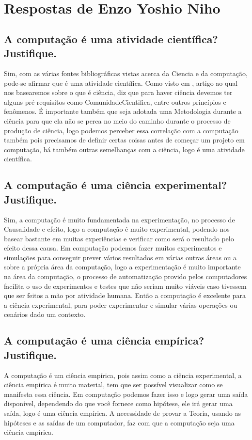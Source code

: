 \section{Respostas de Enzo Yoshio Niho}

\subsection{A computação é uma atividade científica? Justifique. }

Sim, com as várias fontes bibliográficas vistas acerca da \gls{Ciencia} e da computação, pode-se afirmar que é uma atividade científica. Como visto em \citep{fernandes_consideracoes_2021}, artigo ao qual nos basearemos sobre o que é ciência, diz que para haver ciência devemos ter alguns pré-requisitos como \gls{ComunidadeCientifica}, entre outros princípios e fenômenos. É importante também que seja adotada uma \gls{Metodologia} durante a ciência para que ela não se perca no meio do caminho durante o processo de produção de ciência, logo podemos perceber essa correlação com a computação também pois precisamos de definir certas coisas antes de começar um projeto em computação, há também outras semelhanças com a ciência, logo é uma atividade científica.

\subsection{A computação é uma ciência experimental? Justifique. }

Sim, a computação é muito fundamentada na experimentação, no processo de \gls{Causalidade} e efeito, logo a computação é muito experimental, podendo nos basear bastante em muitas experiências e verificar como será o resultado pelo efeito dessa causa. Em computação podemos fazer muitos experimentos e simulações para conseguir prever vários resultados em várias outras áreas ou a sobre a própria área da computação, logo a experimentação é muito importante na área da computação, o processo de automatização provido pelos computadores facilita o uso de experimentos e testes que não seriam muito viáveis caso tivessem que ser feitos a mão por atividade humana. Então a computação é excelente para a ciência experimental, para poder experimentar e simular várias operações ou cenários dado um contexto.

\subsection{A computação é uma ciência empírica? Justifique. }

A computação é um ciência empírica, pois assim como a ciência experimental, a ciência empírica é muito material, tem que ser possível visualizar como se manifesta essa ciência. Em computação podemos fazer isso e logo gerar uma saída disponível, dependendo do que você fornece como hipótese, ele irá gerar uma saída, logo é uma ciência empírica. A necessidade de provar a \gls{Teoria}, usando as hipóteses e as saídas de um computador, faz com que a computação seja uma ciência empírica.